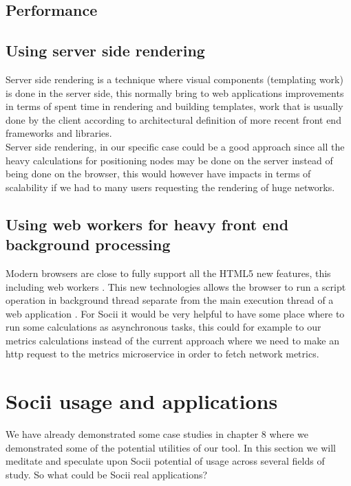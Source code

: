 \subsection{Performance}

\subsection*{Using server side rendering}
Server side rendering is a technique where visual components (templating work) is done in the server side, this normally bring to web applications improvements in terms of spent time in rendering and building templates, work that is usually done by the client according to architectural definition of more recent front end frameworks and libraries.\\
\indent Server side rendering, in our specific case could be a good approach since all the heavy calculations for positioning nodes
may be done on the server instead of being done on the browser, this would however have impacts in terms of scalability if we had to many users requesting
the rendering of huge networks.

\subsection*{Using web workers for heavy front end background processing}
Modern browsers are close to fully support all the HTML5 new features, this including web workers \citep{webworkers}. This new technologies allows
the browser to run a script operation in background thread separate from the main execution thread of a web application \citep{mdnwebworkers}. For Socii it would be very helpful to have some place where to run some calculations as asynchronous tasks, this could for example to our metrics calculations instead of the current approach where we need to make an http request to the metrics microservice in order to fetch network metrics.

\section{Socii usage and applications}
We have already demonstrated some case studies in chapter 8 where we demonstrated some of the potential utilities of our tool. In this section we will meditate and speculate upon Socii potential of usage across several fields of study. So what could be Socii real applications?

